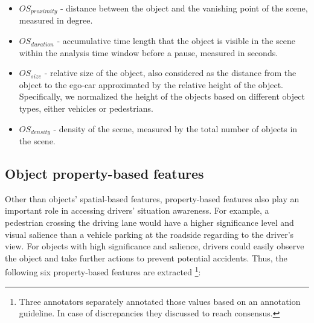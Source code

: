\documentclass[letterpaper, 10 pt, conference]{ieeeconf}  %
\begin{document}
\begin{itemize}
    \item $OS_{proximity}$ - distance between the object and the vanishing point of the scene, measured in degree.
    \item $OS_{duration}$ - accumulative time length that the object is visible in the scene within the analysis time window before a pause, measured in seconds.
    \item $OS_{size}$ - relative size of the object, also considered as the distance from the object to the ego-car approximated by the relative height of the object. Specifically, we normalized the height of the objects based on different object types, either vehicles or pedestrians.
    \item $OS_{density}$ - density of the scene, measured by the total number of objects in the scene.
\end{itemize}

\subsection{Object property-based features}

Other than objects' spatial-based features, property-based features also play an important role in accessing drivers' situation awareness. For example, a pedestrian crossing the driving lane would have a higher significance level and visual salience than a vehicle parking at the roadside regarding to the driver's view. For objects with high significance and salience, drivers could easily observe the object and take further actions to prevent potential accidents. Thus, the following six property-based features are extracted \footnote{Three annotators separately annotated those values based on an annotation guideline. In case of discrepancies they discussed to reach consensus.}:
\end{document}
